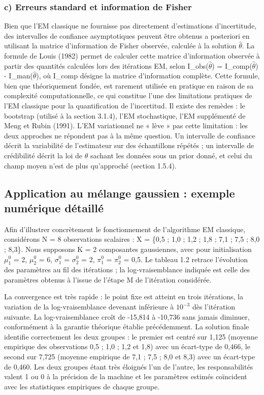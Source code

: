 \subsubsection{c) Erreurs standard et information de Fisher}
Bien que l'EM classique ne fournisse pas directement d'estimations d'incertitude, des intervalles de confiance asymptotiques peuvent être obtenus a posteriori en utilisant la matrice d'information de Fisher observée, calculée à la solution $\hat{\theta }$. La formule de Louis (1982) permet de calculer cette matrice d'information observée à partir des quantités calculées lors des itérations EM, selon I\_obs($\hat{\theta }$) = I\_comp($\hat{\theta }$) - I\_man($\hat{\theta }$), où I\_comp désigne la matrice d'information complète. Cette formule, bien que théoriquement fondée, est rarement utilisée en pratique en raison de sa complexité computationnelle, ce qui constitue l'une des limitations pratiques de l'EM classique pour la quantification de l'incertitud. Il existe des remèdes : le bootstrap (utilisé à la section 3.1.4), l'EM stochastique, l'EM supplémenté de Meng et Rubin (1991). L'EM variationnel ne « lève » pas cette limitation : les deux approches ne répondent pas à la même question. Un intervalle de confiance décrit la variabilité de l'estimateur sur des échantillons répétés ; un intervalle de crédibilité décrit la loi de $\theta$ sachant les données sous un prior donné, et celui du champ moyen n'est de plus qu'approché (section 1.5.4).

\subsection{Application au mélange gaussien : exemple numérique détaillé}
Afin d'illustrer concrètement le fonctionnement de l'algorithme EM classique, considérons N = 8 observations scalaires : X = \{0,5 ; 1,0 ; 1,2 ; 1,8 ; 7,1 ; 7,5 ; 8,0 ; 8,3\}. Nous supposons K = 2 composantes gaussiennes, avec pour initialisation $\mu _{1}^{0}$ = 2, $\mu _{2}^{0}$ = 6, $\sigma _{1}^{0}$ = $\sigma _{2}^{0}$ = 2, $\pi _{1}^{0}$ = $\pi _{2}^{0}$ = 0,5. Le tableau 1.2 retrace l'évolution des paramètres au fil des itérations ; la log-vraisemblance indiquée est celle des paramètres obtenus à l'issue de l'étape M de l'itération considérée.

La convergence est très rapide : le point fixe est atteint en trois itérations, la variation de la log-vraisemblance devenant inférieure à $10^{-3}$ dès l'itération suivante. La log-vraisemblance croît de -15,814 à -10,736 sans jamais diminuer, conformément à la garantie théorique établie précédemment. La solution finale identifie correctement les deux groupes : le premier est centré sur 1,125 (moyenne empirique des observations 0,5 ; 1,0 ; 1,2 et 1,8) avec un écart-type de 0,466, le second sur 7,725 (moyenne empirique de 7,1 ; 7,5 ; 8,0 et 8,3) avec un écart-type de 0,460. Les deux groupes étant très éloignés l'un de l'autre, les responsabilités valent 1 ou 0 à la précision de la machine et les paramètres estimés coïncident avec les statistiques empiriques de chaque groupe.

